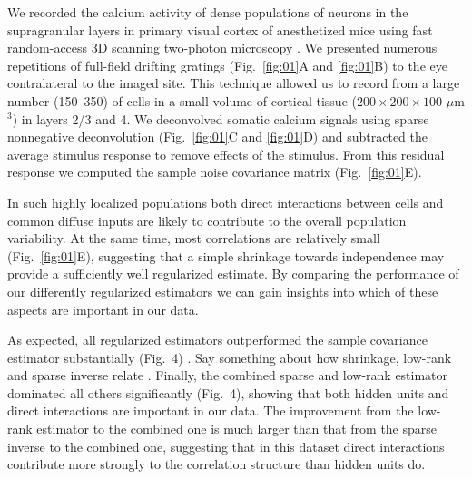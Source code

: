 We recorded the calcium activity of dense populations of neurons in the supragranular layers in primary visual cortex of anesthetized mice using fast random-access 3D scanning two-photon microscopy \cite{Stosiek:2003,Reddy:2005}. We presented numerous repetitions of full-field drifting gratings (Fig.~\ref{fig:01}A and \ref{fig:01}B) to the eye contralateral to the imaged site. This technique allowed us to record from a large number (150--350) of cells in a small volume of cortical tissue ($200\times200\times100$ $\mu$m$^3$) in layers 2/3 and 4. We deconvolved somatic calcium signals using sparse nonnegative deconvolution \cite{Vogelstein:2010} (Fig.~\ref{fig:01}C and \ref{fig:01}D) and subtracted the average stimulus response to remove effects of the stimulus. From this residual response we computed the sample noise covariance matrix (Fig.~\ref{fig:01}E).




In such highly localized populations both direct interactions between cells and common diffuse inputs are likely to contribute to the overall population variability. At the same time, most correlations are relatively small (Fig.~\ref{fig:01}E), suggesting that a simple shrinkage towards independence may provide a sufficiently well regularized estimate. By comparing the performance of our differently regularized estimators we can gain insights into which of these aspects are important in our data.

As expected, all regularized estimators outperformed the sample covariance estimator substantially (Fig.~4) . Say something about how shrinkage, low-rank and sparse inverse relate . Finally, the combined sparse and low-rank estimator dominated all others significantly (Fig.~4), showing that both hidden units and direct interactions are important in our data. The improvement from the low-rank estimator to the combined one is much larger than that from the sparse inverse to the combined one, suggesting that in this dataset direct interactions contribute more strongly to the correlation structure than hidden units do.



